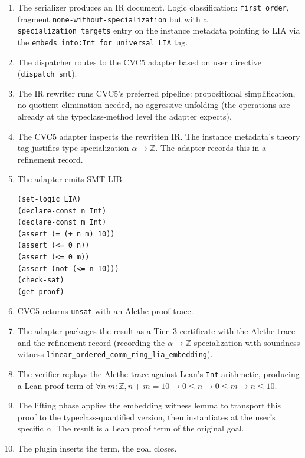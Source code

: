 \documentclass[11pt,letterpaper]{article}
\theoremstyle{definition}
\theoremstyle{remark}
\begin{document}
\begin{enumerate}[leftmargin=2em]
  \item The serializer produces an IR document. Logic classification:
        \texttt{first\_order}, fragment \texttt{none-without-specialization}
        but with a \texttt{specialization\_targets} entry on the
        instance metadata pointing to LIA via the
        \texttt{embeds\_into:Int\_for\_universal\_LIA} tag.
  \item The dispatcher routes to the CVC5 adapter based on user
        directive (\texttt{dispatch\_smt}).
  \item The IR rewriter runs CVC5's preferred pipeline:
        propositional simplification, no quotient elimination needed,
        no aggressive unfolding (the operations are already at the
        typeclass-method level the adapter expects).
  \item The CVC5 adapter inspects the rewritten IR. The instance
        metadata's theory tag justifies type specialization
        $\alpha \to \mathbb{Z}$. The adapter records this in a
        refinement record.
  \item The adapter emits SMT-LIB:
        \begin{lstlisting}[style=plain]
(set-logic LIA)
(declare-const n Int)
(declare-const m Int)
(assert (= (+ n m) 10))
(assert (<= 0 n))
(assert (<= 0 m))
(assert (not (<= n 10)))
(check-sat)
(get-proof)
        \end{lstlisting}
  \item CVC5 returns \texttt{unsat} with an Alethe proof trace.
  \item The adapter packages the result as a Tier~3 certificate with
        the Alethe trace and the refinement record (recording the
        $\alpha \to \mathbb{Z}$ specialization with soundness witness
        \texttt{linear\_ordered\_comm\_ring\_lia\_embedding}).
  \item The verifier replays the Alethe trace against Lean's
        \texttt{Int} arithmetic, producing a Lean proof term of
        $\forall n\ m : \mathbb{Z}, n + m = 10 \to 0 \leq n \to 0 \leq m \to n \leq 10$.
  \item The lifting phase applies the embedding witness lemma to
        transport this proof to the typeclass-quantified version, then
        instantiates at the user's specific $\alpha$. The result is a
        Lean proof term of the original goal.
  \item The plugin inserts the term, the goal closes.
\end{enumerate}
\end{document}
